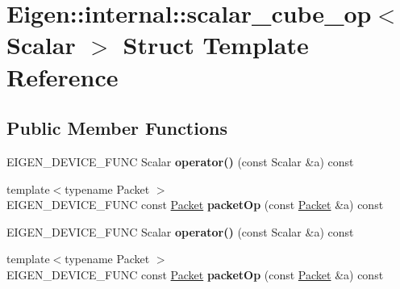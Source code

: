 \hypertarget{struct_eigen_1_1internal_1_1scalar__cube__op}{}\section{Eigen\+:\+:internal\+:\+:scalar\+\_\+cube\+\_\+op$<$ Scalar $>$ Struct Template Reference}
\label{struct_eigen_1_1internal_1_1scalar__cube__op}
\subsection*{Public Member Functions}
\begin{DoxyCompactItemize}
\item 
\mbox{\label{struct_eigen_1_1internal_1_1scalar__cube__op_a1a5188662e3acae2af2041a8bc5250f7}} 
E\+I\+G\+E\+N\+\_\+\+D\+E\+V\+I\+C\+E\+\_\+\+F\+U\+NC Scalar {\bfseries operator()} (const Scalar \&a) const
\item 
\mbox{\label{struct_eigen_1_1internal_1_1scalar__cube__op_a2711b3e32d6312b473b54a2ecbd7ddb8}} 
{\footnotesize template$<$typename Packet $>$ }\\E\+I\+G\+E\+N\+\_\+\+D\+E\+V\+I\+C\+E\+\_\+\+F\+U\+NC const \hyperlink{union_eigen_1_1internal_1_1_packet}{Packet} {\bfseries packet\+Op} (const \hyperlink{union_eigen_1_1internal_1_1_packet}{Packet} \&a) const
\item 
\mbox{\label{struct_eigen_1_1internal_1_1scalar__cube__op_a1a5188662e3acae2af2041a8bc5250f7}} 
E\+I\+G\+E\+N\+\_\+\+D\+E\+V\+I\+C\+E\+\_\+\+F\+U\+NC Scalar {\bfseries operator()} (const Scalar \&a) const
\item 
\mbox{\label{struct_eigen_1_1internal_1_1scalar__cube__op_a2711b3e32d6312b473b54a2ecbd7ddb8}} 
{\footnotesize template$<$typename Packet $>$ }\\E\+I\+G\+E\+N\+\_\+\+D\+E\+V\+I\+C\+E\+\_\+\+F\+U\+NC const \hyperlink{union_eigen_1_1internal_1_1_packet}{Packet} {\bfseries packet\+Op} (const \hyperlink{union_eigen_1_1internal_1_1_packet}{Packet} \&a) const
\end{DoxyCompactItemize}


